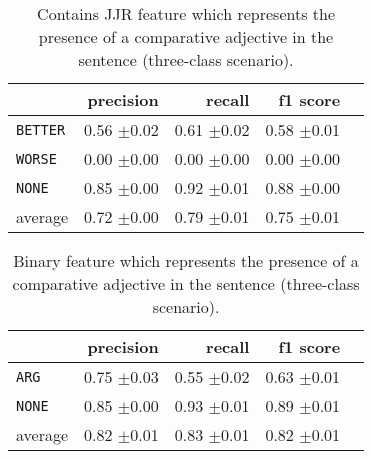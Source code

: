 	
	\begin{table}[htbp] 
		\centering 
		\caption{Contains JJR feature which represents the presence of a comparative adjective in the sentence (three-class scenario).} 

		\begin{tabular}{@{}lrrrr@{}}
			\toprule
			        & precision                & recall                   & f1 score                 \\ \midrule 
\texttt	{BETTER}	&	 0.56 \scriptsize{$\pm$0.02} &	 0.61 \scriptsize{$\pm$0.02} &	 0.58 \scriptsize{$\pm$0.01}  \\ 
\texttt	{WORSE}	&	 0.00 \scriptsize{$\pm$0.00} &	 0.00 \scriptsize{$\pm$0.00} &	 0.00 \scriptsize{$\pm$0.00}  \\ 
\texttt	{NONE}	&	 0.85 \scriptsize{$\pm$0.00} &	 0.92 \scriptsize{$\pm$0.01} &	 0.88 \scriptsize{$\pm$0.00}  \\ 
average	&	 0.72 \scriptsize{$\pm$0.00} &	 0.79 \scriptsize{$\pm$0.01} &	 0.75 \scriptsize{$\pm$0.01}  \\ 
			\bottomrule
		\end{tabular}
	\end{table}
	
		\begin{table}[htbp] 
		\centering 
		\caption{ Binary feature which represents the presence of a comparative adjective in the sentence (three-class scenario). } 
		\label{  }
		\begin{tabular}{@{}lrrrr@{}}
			\toprule
			        & precision                & recall                   & f1 score                 \\ \midrule 
	\texttt{ARG}	&	 0.75 \scriptsize{$\pm$0.03} &	 0.55 \scriptsize{$\pm$0.02} &	 0.63 \scriptsize{$\pm$0.01}  \\ 
	\texttt{NONE}	&	 0.85 \scriptsize{$\pm$0.00} &	 0.93 \scriptsize{$\pm$0.01} &	 0.89 \scriptsize{$\pm$0.01}  \\ 
average	&	 0.82 \scriptsize{$\pm$0.01} &	 0.83 \scriptsize{$\pm$0.01} &	 0.82 \scriptsize{$\pm$0.01}  \\ 
			\bottomrule
		\end{tabular}
	\end{table}
	
